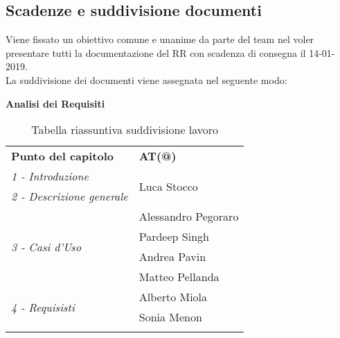 \subsection{Scadenze e suddivisione documenti}
	Viene fissato un obiettivo comune e unanime da parte del team nel voler presentare tutti la documentazione del RR con scadenza di consegna il 14-01-2019.\\
	La suddivisione dei documenti viene assegnata nel seguente modo:
	\\[1.5cm]
		\begin{center}
		\textbf{Analisi dei Requisiti}\\[0.25cm]
		\renewcommand{\arraystretch}{1.5}
		\begin{longtable}{  p{5cm} p{4cm}  }
			
			\rowcolor{tableHeadYellow}
			\textbf{Punto del capitolo}&\textbf{AT(@)}\\
				\emph{1 - Introduzione} & \multirow{2}{*}{Luca Stocco}\\ \emph{2 - Descrizione generale}  \\
				\hline
				\multirow{4}{*}{\emph{3 - Casi d'Uso}} & Alessandro Pegoraro\\&Pardeep Singh\\&Andrea Pavin\\&Matteo Pellanda\\
				\hline
				\multirow{2}{*}{\emph{4 - Requisisti}} &  Alberto Miola\\&Sonia Menon\\
				\hline
				\rowcolor{white}
			\caption{Tabella riassuntiva suddivisione lavoro}
		\end{longtable}	
		\end{center}
	
